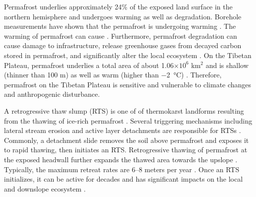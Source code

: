 \documentclass[authoryear,preprint,review,12pt]{elsarticle}
\begin{document}
Permafrost underlies approximately 24\% of the exposed land surface in the northern hemisphere \citep{zhang_statistics_1999} and undergoes warming as well as degradation. Borehole measurements have shown that the permafrost is undergoing  warming  \citep{marchenko_permafrost_2007,osterkamp2005recent,romanovsky_thermal_2010,romanovsky_permafrost_2010,wu2008Recent,zhao_thermal_2010,biskaborn2019permafrost}. The warming of permafrost can cause   \citep{zhao_thermal_2010,aakerman2008thawing,czudek_thermokarst_1970,jorgenson_response_2005,osterkamp_characteristics_2007}. Furthermore, permafrost degradation can cause damage to infrastructure, release greenhouse gases from decayed carbon stored in permafrost, and significantly alter the local ecosystem \citep{tong_effect_1996,grosse_vulnerability_2011,olefeldt_circumpolar_2016,schuur_climate_2015,schuster2018permafrost}. On the Tibetan Plateau, permafrost underlies a total area of about 1.06$\times10^6$ km$^2$ and is shallow (thinner than 100 m) as well as warm (higher than \SI{-2}{\celsius}) \citep{zhou_geocryology_2000}. Therefore, permafrost on the Tibetan Plateau is sensitive and vulnerable to climate changes and anthropogenic disturbance. %

A retrogressive thaw slump (RTS) is one of  of thermokarst landforms resulting from the thawing of ice-rich permafrost  . Several triggering mechanisms including lateral stream erosion and active layer detachments are responsible for RTSs \citep{french2017periglacial}. Commonly, a detachment slide removes the soil above permafrost and exposes it to rapid thawing, then initiates an RTS. Retrogressive thawing of permafrost at the exposed headwall further expands the thawed area towards the upslope \citep{jorgenson_thermokarst_2013}. Typically, the maximum retreat rates are 6--8 meters per year \citep{jorgenson_thermokarst_2013}. Once an RTS initializes, it can be active for decades \citep{burn1989geomorphology, lacelle2010climatic, swanson2018growth,lewkowicz2019extremes} and has significant impacts on the local and downslope ecosystem . 
\end{document}
